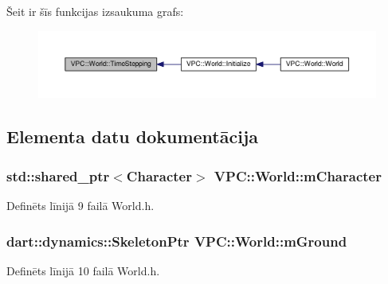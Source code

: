 Šeit ir šīs funkcijas izsaukuma grafs\+:
\nopagebreak
\begin{figure}[H]
\begin{center}
\leavevmode
\includegraphics[width=350pt]{class_v_p_c_1_1_world_ab919f1a2120d4ba69baf6b71310ba44c_icgraph}
\end{center}
\end{figure}




\subsection{Elementa datu dokumentācija}
\subsubsection[{\texorpdfstring{m\+Character}{mCharacter}}]{\setlength{\rightskip}{0pt plus 5cm}std\+::shared\+\_\+ptr$<${\bf Character}$>$ V\+P\+C\+::\+World\+::m\+Character\hspace{0.3cm}{\ttfamily [private]}}\hypertarget{class_v_p_c_1_1_world_a7cb13d4f5210b3dc9156025920d25ad6}{}\label{class_v_p_c_1_1_world_a7cb13d4f5210b3dc9156025920d25ad6}


Definēts līnijā 9 failā World.\+h.

\subsubsection[{\texorpdfstring{m\+Ground}{mGround}}]{\setlength{\rightskip}{0pt plus 5cm}dart\+::dynamics\+::\+Skeleton\+Ptr V\+P\+C\+::\+World\+::m\+Ground\hspace{0.3cm}{\ttfamily [private]}}\hypertarget{class_v_p_c_1_1_world_ab2bdb8cd4e8fa1e043cceef8a2c123f1}{}\label{class_v_p_c_1_1_world_ab2bdb8cd4e8fa1e043cceef8a2c123f1}


Definēts līnijā 10 failā World.\+h.

